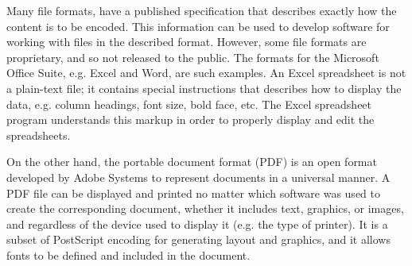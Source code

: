 Many file formats, have a published specification that describes
exactly how the content is to be encoded.  This information can be
used to develop software for working with files in the described
format. However, some file formats are proprietary, and so not
released to the public.  The formats for the Microsoft Office Suite,
e.g. Excel and Word, are such examples.  An Excel spreadsheet is not
a plain-text file; it contains special instructions that describes how
to display the data, e.g. column headings, font size, bold face, etc.
The Excel spreadsheet program understands this markup in order to
properly display and edit the spreadsheets.

On the other hand, the portable document format (PDF) is an open
format developed by Adobe Systems to represent documents in a
universal manner.  A PDF file can be displayed and printed no matter
which software was used to create the corresponding document, whether
it includes text, graphics, or images, and regardless of the device
used to display it (e.g. the type of printer).  It is a subset of
PostScript encoding for generating layout and graphics, and it allows
fonts to be defined and included in the document.


